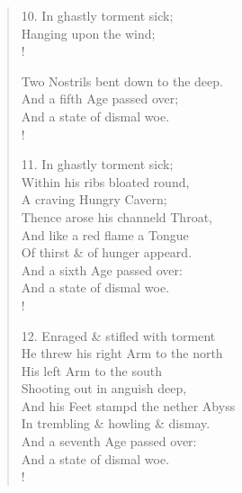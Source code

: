 \documentclass[9pt]{extarticle}
\begin{document}
\begin{verse}
\begin{altverse}
		10. In ghastly torment sick;\\
		Hanging upon the wind;\\!
		
		Two Nostrils bent down to the deep.\\
		And a fifth Age passed over;\\
		And a state of dismal woe.\\!
		
		11. In ghastly torment sick;\\
		Within his ribs bloated round,\\
		A craving Hungry Cavern;\\
		Thence arose his channeld Throat,\\
		And like a red flame a Tongue\\
		Of thirst \& of hunger appeard.\\
		And a sixth Age passed over:\\
		And a state of dismal woe.\\!
		
		12. Enraged \& stifled with torment\\
		He threw his right Arm to the north\\
		His left Arm to the south\\
		Shooting out in anguish deep,\\
		And his Feet stampd the nether Abyss\\
		In trembling \& howling \& dismay.\\
		And a seventh Age passed over:\\
		And a state of dismal woe.\\!
		
\end{altverse}
\end{verse}	
\end{document}
